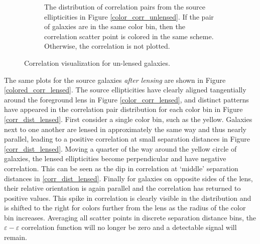 \documentclass[%
 reprint,
 amsmath,amssymb,
 aps,nofootinbib
]{revtex4-1}
\begin{document}
\begin{figure}
\begin{subfigure}{0.45\textwidth}
        \captionsetup{justification=raggedright,singlelinecheck=false}
        \caption{The distribution of correlation pairs from the source ellipticities in Figure \ref{color_corr_unlensed}. If the pair of galaxies are in the same color bin, then the correlation scatter point is colored in the same scheme. Otherwise, the correlation is not plotted.}
        \label{corr_dist_unlensed}
    \end{subfigure}
    \caption{Correlation visualization for un-lensed galaxies.}
    \label{colored_corr}
\end{figure}

The same plots for the source galaxies \textit{after lensing} are shown in Figure \ref{colored_corr_lensed}. The source ellipticities have clearly aligned tangentially around the foreground lens in Figure \ref{color_corr_lensed}, and distinct patterns have appeared in the correlation pair distribution for each color bin in Figure \ref{corr_dist_lensed}. First consider a single color bin, such as the yellow. Galaxies next to one another are lensed in approximately the same way and thus nearly parallel, leading to a positive correlation at small separation distances in Figure \ref{corr_dist_lensed}. Moving a quarter of the way around the yellow circle of galaxies, the lensed ellipticities become perpendicular and have negative correlation. This can be seen as the dip in correlation at `middle' separation distances in \ref{corr_dist_lensed}. Finally for galaxies on opposite sides of the lens, their relative orientation is again parallel and the correlation has returned to positive values. This spike in correlation is clearly visible in the distribution and is shifted to the right for colors further from the lens as the radius of the color bin increases. Averaging all scatter points in discrete separation distance bins, the $\varepsilon-\varepsilon$ correlation function will no longer be zero and a detectable signal will remain.
\end{document}
